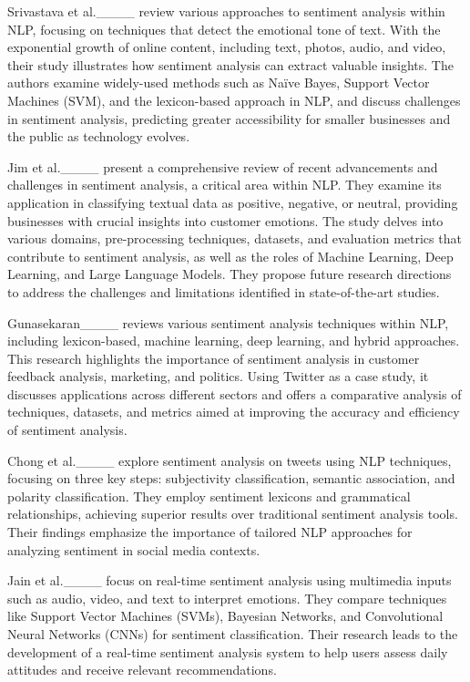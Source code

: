 Srivastava et al.____ review various approaches to sentiment analysis within NLP, focusing on techniques that detect the emotional tone of text. With the exponential growth of online content, including text, photos, audio, and video, their study illustrates how sentiment analysis can extract valuable insights. The authors examine widely-used methods such as Naïve Bayes, Support Vector Machines (SVM), and the lexicon-based approach in NLP, and discuss challenges in sentiment analysis, predicting greater accessibility for smaller businesses and the public as technology evolves.

Jim et al.____ present a comprehensive review of recent advancements and challenges in sentiment analysis, a critical area within NLP. They examine its application in classifying textual data as positive, negative, or neutral, providing businesses with crucial insights into customer emotions. The study delves into various domains, pre-processing techniques, datasets, and evaluation metrics that contribute to sentiment analysis, as well as the roles of Machine Learning, Deep Learning, and Large Language Models. They propose future research directions to address the challenges and limitations identified in state-of-the-art studies.

Gunasekaran____ reviews various sentiment analysis techniques within NLP, including lexicon-based, machine learning, deep learning, and hybrid approaches. This research highlights the importance of sentiment analysis in customer feedback analysis, marketing, and politics. Using Twitter as a case study, it discusses applications across different sectors and offers a comparative analysis of techniques, datasets, and metrics aimed at improving the accuracy and efficiency of sentiment analysis.

Chong et al.____ explore sentiment analysis on tweets using NLP techniques, focusing on three key steps: subjectivity classification, semantic association, and polarity classification. They employ sentiment lexicons and grammatical relationships, achieving superior results over traditional sentiment analysis tools. Their findings emphasize the importance of tailored NLP approaches for analyzing sentiment in social media contexts.

Jain et al.____ focus on real-time sentiment analysis using multimedia inputs such as audio, video, and text to interpret emotions. They compare techniques like Support Vector Machines (SVMs), Bayesian Networks, and Convolutional Neural Networks (CNNs) for sentiment classification. Their research leads to the development of a real-time sentiment analysis system to help users assess daily attitudes and receive relevant recommendations.

